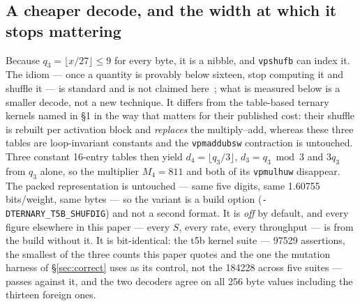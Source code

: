 \documentclass[11pt,a4paper]{article}
\newcommand{\code}[1]{\texttt{#1}}
\begin{document}
\subsection{A cheaper decode, and the width at which it stops
mattering}\label{sec:shufdig}
Because $q_3=\lfloor x/27\rfloor\le 9$ for every byte, it is a nibble, and
\code{vpshufb} can index it. The idiom --- once a quantity is provably below
sixteen, stop computing it and shuffle it --- is standard and is not claimed
here~\cite{mulapshufb}; what is measured below is a smaller decode, not a new
technique. It differs from the table-based ternary kernels named in \S1 in the way that matters for their published cost: their
shuffle is rebuilt per activation block and \emph{replaces} the multiply--add,
whereas these three tables are loop-invariant constants and the
\code{vpmaddubsw} contraction is untouched. Three constant 16-entry tables then yield
$d_4=\lfloor q_3/3\rfloor$, $d_3=q_3\bmod 3$ and $3q_3$ from $q_3$ alone, so the
multiplier $M_4=\num{811}$ and both of its \code{vpmulhuw} disappear. The packed
representation is untouched --- same five digits, same \num{1.60755}
bits/weight, same bytes --- so the variant is a build option
(\code{-DTERNARY\_T5B\_SHUFDIG}) and not a second format. It is \emph{off} by
default, and every figure elsewhere in this paper --- every $S$, every rate,
every throughput --- is from the build without it. It is bit-identical: the t5b
kernel suite --- \num{97529} assertions, the smallest of the three counts this
paper quotes and the one the mutation harness of \S\ref{sec:correct} uses as its
control, not the \num{184228} across five suites --- passes against it, and the
two decoders
agree on all 256 byte values including the thirteen foreign ones.
\end{document}
